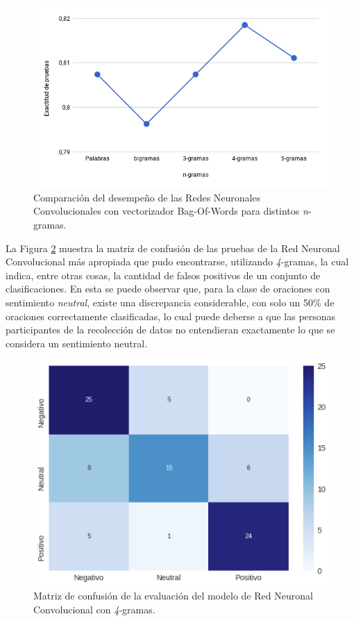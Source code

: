 \documentclass[conference]{IEEEtran}
\begin{document}
        \begin{figure}[htbp]
            \centerline{\includegraphics[width=\linewidth]{figuras/acc_rnc_ngrams.png}}
            \caption{Comparación del desempeño de las Redes Neuronales Convolucionales con vectorizador Bag-Of-Words para distintos \textit{n}-gramas.}
            \label{fig:acc_rnc_ngrams}
        \end{figure}
    
        La Figura \ref{fig:matriz_confusion} muestra la matriz de confusión de las pruebas de la Red Neuronal Convolucional más apropiada que pudo encontrarse, utilizando \textit{4}-gramas, la cual indica, entre otras cosas, la cantidad de falsos positivos de un conjunto de clasificaciones. En esta se puede observar que, para la clase de oraciones con sentimiento \textit{neutral}, existe una discrepancia considerable, con solo un 50\% de oraciones correctamente clasificadas, lo cual puede deberse a que las personas participantes de la recolección de datos no entendieran exactamente lo que se considera un sentimiento neutral.
    
        \begin{figure}[htbp]
            \centerline{\includegraphics[width=\linewidth]{figuras/matriz_confusion.png}}
            \caption{Matriz de confusión de la evaluación del modelo de Red Neuronal Convolucional con \textit{4}-gramas.}
            \label{fig:matriz_confusion}
        \end{figure}
    
\end{document}
